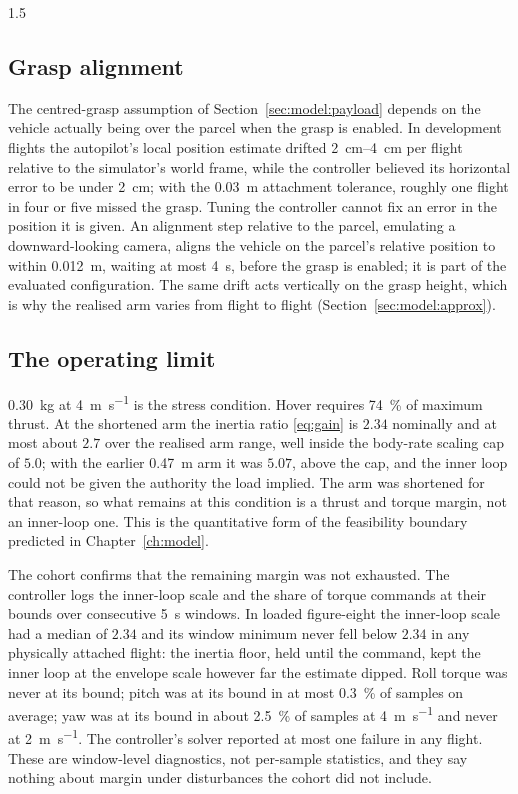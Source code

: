 \begin{spacing}{1.5}
\subsection{Grasp alignment}\label{sec:eval:alignment}

The centred-grasp assumption of Section~\ref{sec:model:payload} depends on the
vehicle actually being over the parcel when the grasp is enabled. In development
flights the autopilot's local position estimate drifted
\SIrange{2}{4}{\centi\meter} per flight relative to the simulator's world frame,
while the controller believed its horizontal error to be under
\SI{2}{\centi\meter}; with the \SI{0.03}{\meter} attachment tolerance, roughly one
flight in four or five missed the grasp. Tuning the controller cannot fix an
error in the position it is given. An alignment step relative to the parcel,
emulating a downward-looking camera, aligns the vehicle on the parcel's relative
position to within \SI{0.012}{\meter}, waiting at most \SI{4}{\second}, before
the grasp is enabled; it is part of the evaluated configuration. The same drift
acts vertically on the grasp height, which is why the realised arm varies from
flight to flight (Section~\ref{sec:model:approx}).

\subsection{The operating limit}\label{sec:eval:opslimit}

\SI{0.30}{\kg} at \SI{4}{\meter\per\second} is the stress condition. Hover
requires \SI{74}{\percent} of maximum thrust. At the shortened arm the inertia
ratio \eqref{eq:gain} is $2.34$ nominally and at most about $2.7$ over the
realised arm range, well inside the body-rate scaling cap of $5.0$; with the
earlier \SI{0.47}{\meter} arm it was $5.07$, above the cap, and the inner loop
could not be given the authority the load implied. The arm was shortened for that
reason, so what remains at this condition is a thrust and torque margin, not an
inner-loop one. This is the quantitative form of the feasibility boundary
predicted in Chapter~\ref{ch:model}.

The cohort confirms that the remaining margin was not exhausted. The
controller logs the inner-loop scale and the share of torque commands at their
bounds over consecutive \SI{5}{\second} windows. In loaded figure-eight the
inner-loop scale had a median of $2.34$ and its window minimum never fell below
$2.34$ in any physically attached flight: the inertia floor, held until the
command, kept the inner loop at the envelope scale however far the estimate
dipped. Roll torque was never at its
bound; pitch was at its bound in at most \SI{0.3}{\percent} of samples on
average; yaw was at its bound in about \SI{2.5}{\percent} of samples at
\SI{4}{\meter\per\second} and never at \SI{2}{\meter\per\second}. The
controller's solver reported at most one failure in any flight. These are
window-level diagnostics, not per-sample statistics, and they say nothing about
margin under disturbances the cohort did not include.


\end{spacing}
